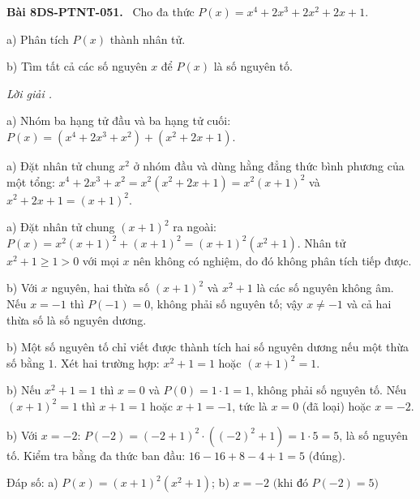 \documentclass[12pt,a4paper]{article}
\newenvironment{problem}[1][]{\par\medskip\noindent\textbf{Bài #1.}\ }{\par}
\newenvironment{solution}[1][]{\par\noindent\textit{Lời giải #1.}\par}{\par}
\begin{document}
\begin{problem}[8DS-PTNT-051]
Cho đa thức $P(x) = x^4 + 2x^3 + 2x^2 + 2x + 1$.

a) Phân tích $P(x)$ thành nhân tử.

b) Tìm tất cả các số nguyên $x$ để $P(x)$ là số nguyên tố.

\begin{solution}
a) Nhóm ba hạng tử đầu và ba hạng tử cuối: $P(x) = (x^4 + 2x^3 + x^2) + (x^2 + 2x + 1)$.

a) Đặt nhân tử chung $x^2$ ở nhóm đầu và dùng hằng đẳng thức bình phương của một tổng: $x^4 + 2x^3 + x^2 = x^2(x^2 + 2x + 1) = x^2(x + 1)^2$ và $x^2 + 2x + 1 = (x + 1)^2$.

a) Đặt nhân tử chung $(x + 1)^2$ ra ngoài: $P(x) = x^2(x + 1)^2 + (x + 1)^2 = (x + 1)^2(x^2 + 1)$. Nhân tử $x^2 + 1 \geq 1 > 0$ với mọi $x$ nên không có nghiệm, do đó không phân tích tiếp được.

b) Với $x$ nguyên, hai thừa số $(x + 1)^2$ và $x^2 + 1$ là các số nguyên không âm. Nếu $x = -1$ thì $P(-1) = 0$, không phải số nguyên tố; vậy $x \neq -1$ và cả hai thừa số là số nguyên dương.

b) Một số nguyên tố chỉ viết được thành tích hai số nguyên dương nếu một thừa số bằng $1$. Xét hai trường hợp: $x^2 + 1 = 1$ hoặc $(x + 1)^2 = 1$.

b) Nếu $x^2 + 1 = 1$ thì $x = 0$ và $P(0) = 1 \cdot 1 = 1$, không phải số nguyên tố. Nếu $(x + 1)^2 = 1$ thì $x + 1 = 1$ hoặc $x + 1 = -1$, tức là $x = 0$ (đã loại) hoặc $x = -2$.

b) Với $x = -2$: $P(-2) = (-2 + 1)^2 \cdot ((-2)^2 + 1) = 1 \cdot 5 = 5$, là số nguyên tố. Kiểm tra bằng đa thức ban đầu: $16 - 16 + 8 - 4 + 1 = 5$ (đúng).

Đáp số: a) $\boxed{P(x) = (x + 1)^2(x^2 + 1)}$; b) $\boxed{x = -2 \text{ (khi đó } P(-2) = 5\text{)}}$
\end{solution}
\end{problem}
\end{document}

